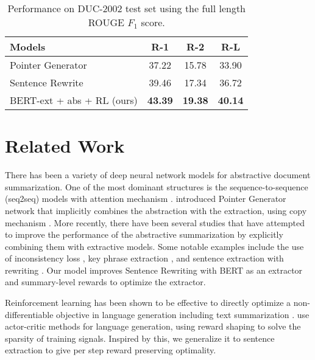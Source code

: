 \documentclass[11pt,a4paper]{article}
\begin{document}
\begin{table}
\begin{center}
\begin{adjustbox}{max width=\columnwidth}
\begin{tabular}{l|ccc}
    \hline 
    \bf Models & \bf R-1 & \bf R-2 & \bf R-L \\ 
    \hline
    Pointer Generator \cite{see-etal-2017-get} & 37.22 & 15.78 & 33.90 \\
    Sentence Rewrite \cite{chen-bansal-2018-fast} & 39.46 & 17.34 & 36.72 \\
    BERT-ext + abs + RL (ours) & \bf 43.39 & \bf 19.38 & \bf 40.14 \\
    \hline
\end{tabular}
\end{adjustbox}
\end{center}
\caption{\label{table:duc2002} Performance on DUC-2002 test set using
the full length ROUGE $F_1$ score.}
\end{table}

\section{Related Work}




There has been a variety of deep neural network models for
abstractive document summarization. One of the most dominant
structures is the sequence-to-sequence (seq2seq) models with attention mechanism 
\cite{rush-etal-2015-neural, chopra-etal-2016-abstractive, nallapati-etal-2016-abstractive}.
\citet{see-etal-2017-get} introduced Pointer Generator network
that implicitly combines the abstraction with the extraction,
using copy mechanism \cite{gu-etal-2016-incorporating, zeng2016efficient}.
More recently, there have been several studies that have attempted to improve
the performance of the abstractive summarization by explicitly combining them
with extractive models.
Some notable examples include the use of inconsistency loss \cite{hsu-etal-2018-unified},
key phrase extraction \cite{li-etal-2018-guiding, gehrmann-etal-2018-bottom}, and
sentence extraction with rewriting \cite{chen-bansal-2018-fast}.
Our model improves Sentence Rewriting with BERT as an extractor and summary-level rewards
to optimize the extractor.

Reinforcement learning has been shown to be effective to directly optimize
a non-differentiable objective in language generation including text summarization
\cite{DBLP:journals/corr/RanzatoCAZ15, DBLP:conf/iclr/BahdanauBXGLPCB17, paulus2018a, celikyilmaz-etal-2018-deep, narayan-etal-2018-ranking}.
\citet{DBLP:conf/iclr/BahdanauBXGLPCB17} use actor-critic methods
for language generation, using reward shaping \cite{Ng:1999:PIU:645528.657613}
to solve the sparsity of training signals. Inspired by this,
we generalize it to sentence extraction to give per step reward
preserving optimality.
\end{document}
